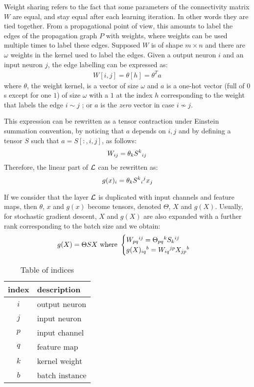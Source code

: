 Weight sharing refers to the fact that some parameters of the connectivity matrix $W$ are equal, and stay equal after each learning iteration. In other words they are tied together. From a propagational point of view, this amounts to label the edges of the propagation graph $P$ with weights, where weights can be used multiple times to label these edges. Supposed $W$ is of shape $m \times n$ and there are $\omega$ weights in the kernel used to label the edges. Given a output neuron $i$ and an input neuron $j$, the edge labelling can be expressed as:
\begin{gather}
W[i,j] = \theta[h] = \theta^T a \label{eq:alloc}
\end{gather}
where $\theta$, the weight kernel, is a vector of size $\omega$ and $a$ is a one-hot vector (full of $0$s except for one $1$) of size $\omega$ with a $1$ at the index $h$ corresponding to the weight that labels the edge $i \sim j$ ; or $a$ is the \emph{zero} vector in case $i \nsim j$.

This expression can be rewritten as a tensor contraction under Einstein summation convention, by noticing that $a$ depends on $i,j$ and by defining a tensor $S$ such that $a = S[:,i,j]$, as follows:
\begin{gather}
W_{ij} = \theta_k S^k \h{0}_{ij}
\end{gather}
Therefore, the linear part of $\cl$ can be rewritten as:
\begin{gather}
g(x)_i = \theta_k S^k \h{0}_i \h{0}^j x_j
\end{gather}

If we consider that the layer $\cl$ is duplicated with input channels and feature maps, then $\theta$, $x$ and $g(x)$ become tensors, denoted $\Theta$, $X$ and $g(X)$. Usually, for stochastic gradient descent, $X$ and $g(X)$ are also expanded with a further rank corresponding to the batch size and we obtain:
\begin{gather}
g(X) = \Theta S X
\text{ where } \begin{cases} W_{pq}\h{0}^{ij} = \Theta_{pq}\h{0}^k S_k\h{0}^{ij} \\ g(X)_{iq}\h{0}^b = W_{iq}\h{0}^{jp} X_{jp}\h{0}^{b} \end{cases} \label{eq:ternary}
\end{gather}

\begin{table}[H]
  \centering
\begin{tabular}{cl}
  index & description\\
  \hline
  $i$ & output neuron\\
  $j$ & input neuron\\
  $p$ & input channel\\
  $q$ & feature map\\
  $k$ & kernel weight\\
  $b$ & batch instance\\
\end{tabular}
\caption{Table of indices}%
\end{table}

